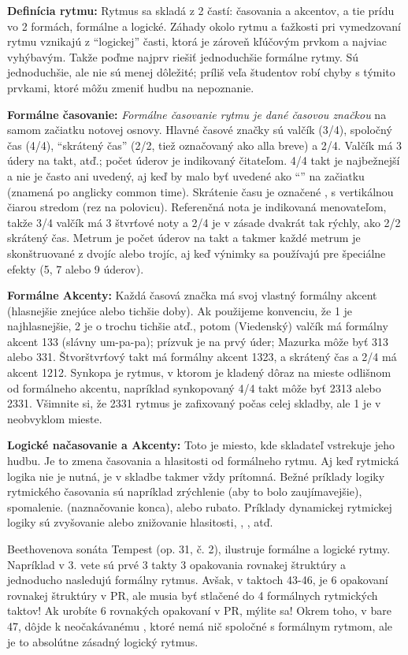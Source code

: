 \textbf{Definícia rytmu:} Rytmus sa skladá z 2 častí: časovania a akcentov, a tie prídu vo 2 formách, formálne a logické. Záhady okolo rytmu a ťažkosti pri vymedzovaní rytmu vznikajú z “logickej” časti, ktorá je zároveň kľúčovým prvkom a najviac vyhýbavým. Takže poďme najprv riešiť jednoduchšie formálne rytmy. Sú jednoduchšie, ale nie sú menej dôležité; príliš veľa študentov robí chyby s týmito prvkami, ktoré môžu zmeniť hudbu na nepoznanie.

\textbf{Formálne časovanie:} \emph{Formálne časovanie rytmu je dané časovou značkou} na samom začiatku notovej osnovy. Hlavné časové značky sú valčík (3/4), spoločný čas (4/4), “skrátený čas” (2/2, tiež označovaný ako alla breve) a 2/4. Valčík má 3 údery na takt, atď.; počet úderov je indikovaný čitateľom. 4/4 takt je najbežnejší a nie je často ani uvedený, aj keď by malo byť uvedené ako “\noteCommonTime” na začiatku (\noteCommonTime znamená po anglicky common time). Skrátenie času je označené \noteCutTime, s vertikálnou čiarou stredom (rez na polovicu). Referenčná nota je indikovaná menovateľom, takže 3/4 valčík má 3 štvrťové noty a 2/4 je v zásade dvakrát tak rýchly, ako 2/2 skrátený čas. Metrum je počet úderov na takt a takmer každé metrum je skonštruované z dvojíc alebo trojíc, aj keď výnimky sa používajú pre špeciálne efekty (5, 7 alebo 9 úderov).

\textbf{Formálne Akcenty:} Každá časová značka má svoj vlastný formálny akcent (hlasnejšie znejúce alebo tichšie doby). Ak použijeme konvenciu, že 1 je najhlasnejšie, 2 je o trochu tichšie atď., potom (Viedenský) valčík má formálny akcent 133 (slávny um-pa-pa); prízvuk je na prvý úder; Mazurka môže byť 313 alebo 331. Štvorštvrťový takt má formálny akcent 1323, a skrátený čas a 2/4 má akcent 1212. Synkopa je rytmus, v ktorom je kladený dôraz na mieste odlišnom od formálneho akcentu, napríklad synkopovaný 4/4 takt môže byť 2313 alebo 2331. Všimnite si, že 2331 rytmus je zafixovaný počas celej skladby, ale 1 je v neobvyklom mieste.

\textbf{Logické načasovanie a Akcenty:} Toto je miesto, kde skladateľ vstrekuje jeho hudbu. Je to zmena časovania a hlasitosti od formálneho rytmu. Aj keď rytmická logika nie je nutná, je v skladbe takmer vždy prítomná. Bežné príklady logiky rytmického časovania sú napríklad zrýchlenie (aby to bolo zaujímavejšie), spomalenie. (naznačovanie konca), alebo rubato. Príklady dynamickej rytmickej logiky sú  zvyšovanie alebo znižovanie hlasitosti, , , atď.

Beethovenova sonáta Tempest (op. 31, č. 2), ilustruje formálne a logické rytmy. Napríklad v 3. vete sú prvé 3 takty 3 opakovania rovnakej štruktúry a jednoducho nasledujú formálny rytmus. Avšak, v taktoch 43-46, je 6 opakovaní rovnakej štruktúry v PR, ale musia byť stlačené do 4 formálnych rytmických taktov! Ak urobíte 6 rovnakých opakovaní v PR, mýlite sa! Okrem toho, v bare 47, dôjde k neočakávanému , ktoré nemá nič spoločné s formálnym rytmom, ale je to absolútne zásadný logický rytmus.

